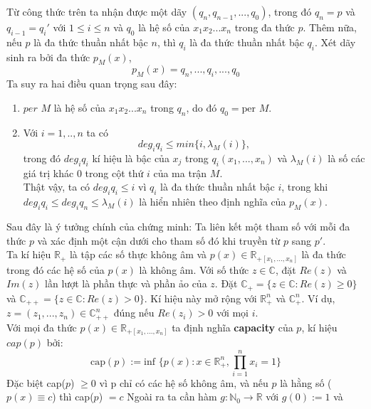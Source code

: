 \documentclass[a4paper, 12pt]{report}
\begin{document}
Từ công thức trên ta nhận được một dãy $(q_n,q_{n-1},...,q_0)$, trong đó $q_n=p$ và $q_{i-1} = q_{i}'$ với $1 \leq i \leq n$ và $q_0$ là hệ số của $x_1x_2...x_n$ trong đa thức $p$. Thêm nữa, nếu $p$ là đa thức thuần nhất bậc $n$, thì $q_i$ là đa thức thuần nhất bậc $q_i$. Xét dãy sinh ra bởi đa thức $p_M(x)$,
\begin{equation*}
p_M(x) = q_n,...,q_i,...,q_0
\end{equation*}
Ta suy ra hai điều quan trọng sau đây: 
\begin{enumerate}[label=\textbf{\Alph*.}]
\item $per$ $M$ là hệ số của $x_1x_2...x_n$ trong $q_n$, do đó $q_0 = \textrm{per }M$.
\item Với  $i=1,..,n$ ta có
\begin{equation}
	deg_{i}q_i \leq min\{i,\lambda_M(i)\}, \label{deg}
\end{equation}
trong đó $deg_{i}q_i $ kí hiệu là bậc của $x_{j}$ trong $q_i(x_1,...,x_n)$ và $\lambda_M(i)$ là số các giá trị khác 0 trong cột thứ $i$ của ma trận $M$. \\
Thật vậy, ta có $deg_{i}q_i \leq i$ vì $q_i$ là đa thức thuần nhất bậc $i$, trong khi $deg_{i}q_i \leq deg_{i}q_n \leq \lambda_M(i)$ là hiển nhiên theo định nghĩa của $p_M(x)$.
\end{enumerate}
Sau đây là ý tưởng chính của chứng minh: Ta liên kết một tham số với mỗi đa thức $p$ và xác định một cận dưới cho tham số đó khi truyền từ $p$ sang $p'$.\\
Ta kí hiệu $\mathbb{R}_{+}$ là tập các số thực không âm và $p(x) \in \mathbb{R}_{+[x_1,...,x_n]}$ là đa thức trong đó các hệ số của $p(x)$ là không âm. Với số thức $z \in \mathbb{C}$, đặt $Re(z)$ và $Im(z)$ lần lượt là phần thực và phần ảo của $z$. Đặt $\mathbb{C}_{+} = \{z \in \mathbb{C}: Re(z) \geq 0\}$ và $\mathbb{C}_{++} = \{z \in \mathbb{C}: Re(z) > 0\}$. Kí hiệu này mở rộng với $\mathbb{R}_{+}^{n}$ và $\mathbb{C}_{+}^{n}$. Ví dụ, $z=(z_1,...,z_n) \in \mathbb{C}_{++}^{n}$ đúng nếu $Re(z_i) >0$ với mọi $i$.\\
Với mọi đa thức $p(x) \in \mathbb{R}_{+[x_1,...,x_n]}$ ta định nghĩa \textbf{capacity} của $p$, kí hiệu $cap(p)$ bởi:
\begin{equation*}
\textrm{cap}(p) := \textrm{inf }\{p(x): x \in \mathbb{R}_{+}^{n}, \displaystyle \prod_{i=1}^{n}x_i = 1 \}
\end{equation*}
Đặc biệt cap($p$) $\geq 0$ vì p chỉ có các hệ số không âm, và nếu $p$ là hằng số ($p(x) \equiv c$) thì cap($p$) $= c$
Ngoài ra ta cần hàm $g: \mathbb{N}_{0} \rightarrow \mathbb{R}$ với $g(0) :=1$ và 
\end{document}
